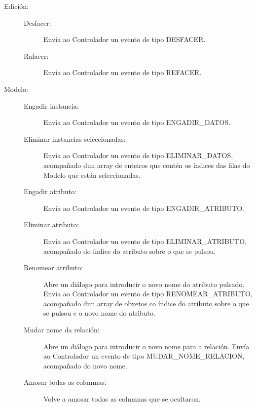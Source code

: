 \begin{description}
\begin{description}
\end{description}

\item[Edición:] \hfill

\begin{description}

\item[Desfacer:] \hfill
Envía ao Controlador un evento de tipo DESFACER.

\item[Rafacer:] \hfill
Envía ao Controlador un evento de tipo REFACER.

\end{description}

\item[Modelo:] \hfill

\begin{description}

\item[Engadir instancia:] \hfill
Envía ao Controlador un evento de tipo ENGADIR\_DATOS.

\item[Eliminar instancias seleccionadas:] \hfill
Envía ao Controlador un evento de tipo ELIMINAR\_DATOS, acompañado dun array de enteiros que contén os índices das filas do Modelo que están seleccionadas.

\item[Engadir atributo:] \hfill
Envía ao Controlador un evento de tipo ENGADIR\_ATRIBUTO.

\item[Eliminar atributo:] Envía ao Controlador un evento de tipo ELIMINAR\_ATRIBUTO, acompañado do índice do atributo sobre o que se pulsou.

\item[Renomear atributo:] \hfill
Abre un diálogo para introducir o novo nome do atributo pulsado. Envía ao Controlador un evento de tipo RENOMEAR\_ATRIBUTO, acompañado dun array de obxetos co índice do atributo sobre o que se pulsou e o novo nome do atributo.

\item[Mudar nome da relación:] \hfill
Abre un diálogo para introducir o novo nome para a relación. Envía ao Controlador un evento de tipo MUDAR\_NOME\_RELACION, acompañado do novo nome.

\item[Amosar todas as columnas:] \hfill
Volve a amosar todas as columnas que se ocultaron.

\end{description}


\end{description}
